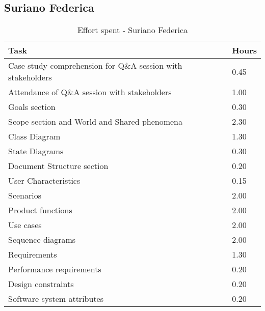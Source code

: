 \subsection{Suriano Federica}
\renewcommand{\arraystretch}{2}
\begin{longtable}{|m{9cm}|m{1.2cm}|}
\caption{Effort spent - Suriano Federica}\\
\hline
\endfirsthead
\endhead
\hline
\endlastfoot
\rowcolor{green2}
\textbf{Task} &\hfil {\textbf{Hours}}\\
\hline
Case study comprehension for Q\&A session with stakeholders & \hfil 0.45\\
Attendance of Q\&A session with stakeholders & \hfil 1.00\\
Goals section & \hfil 0.30\\
Scope section and World and Shared phenomena & \hfil 2.30\\
Class Diagram & \hfil 1.30\\
State Diagrams & \hfil 0.30\\
Document Structure section & \hfil 0.20\\
User Characteristics & \hfil 0.15\\
Scenarios  & \hfil 2.00\\
Product functions & \hfil 2.00\\
Use cases & \hfil 2.00\\
Sequence diagrams & \hfil 2.00\\
Requirements & \hfil 1.30\\
Performance requirements& \hfil 0.20\\
Design constraints& \hfil 0.20\\
Software system attributes& \hfil 0.20\\
\hline
\end{longtable}
